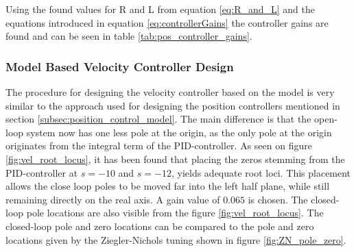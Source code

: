 \documentclass[../../main.tex]{subfiles}
\begin{document}
Using the found values for R and L from equation \ref{eq:R_and_L} and the equations introduced in equation \ref{eq:controllerGains} the controller gains are found and can be seen in table \ref{tab:pos_controller_gains}.







\subsubsection*{Model Based Velocity Controller Design}
The procedure for designing the velocity controller based on the model is very similar to the approach used for designing the position controllers mentioned in section \ref{subsec:position_control_model}. The main difference is that the open-loop system now has one less pole at the origin, as the only pole at the origin originates from the integral term of the PID-controller. As seen on figure \ref{fig:vel_root_locus}, it has been found that placing the zeros stemming from the PID-controller at $s = -10$ and $s = -12$, yields adequate root loci. This placement allows the close loop poles to be moved far into the left half plane, while still remaining directly on the real axis. A gain value of $0.065$ is chosen. The closed-loop pole locations are also visible from the figure \ref{fig:vel_root_locus}. The closed-loop pole and zero locations can be compared to the pole and zero locations given by the Ziegler-Nichols tuning shown in figure \ref{fig:ZN_pole_zero}.
\end{document}
